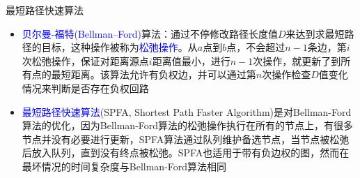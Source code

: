 \begin{frame}{最短路径快速算法}
    \begin{itemize}
        \item \textcolor{blue}{贝尔曼-福特(Bellman–Ford)}算法：通过不停修改路径长度值$D$来达到求最短路径的目标，这种操作被称为\textcolor{blue}{松弛操作}。从$a$点到$b$点，不会超过$n-1$条边，第$i$次松弛操作，保证对距离源点$i$距离值最小，进行$n-1$次操作，就更新了到所有点的最短距离。该算法允许有负权边，并可以通过第$n$次操作检查$D$值变化情况来判断是否存在负权回路
        \vfill
        \item \textcolor{blue}{最短路径快速算法}(SPFA, Shortest Path Faster Algorithm)是对Bellman-Ford算法的优化，因为Bellman-Ford算法的松弛操作执行在所有的节点上，有很多节点并没有必要进行更新，SPFA算法通过队列维护备选节点，当节点被松弛后放入队列，直到没有终点被松弛。SPFA也适用于带有负边权的图，然而在最坏情况的时间复杂度与Bellman-Ford算法相同
\end{itemize}
\end{frame}
